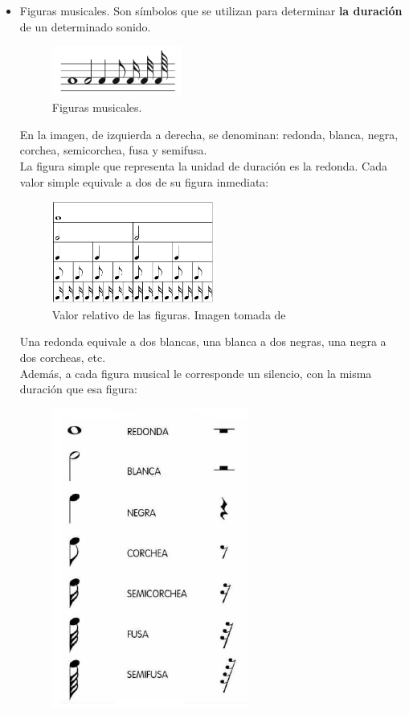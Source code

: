 \documentclass[a4paper, openright, 11pt, titlepage]{report}
\theoremstyle{definition}\newtheorem{defin}[propo]{Definition}
\theoremstyle{definition}\newtheorem{obser}[propo]{Remark}
\theoremstyle{definition}\newtheorem{ejem}[propo]{Ejemplo}
\theoremstyle{definition}\newtheorem{algoritmo}[propo]{Algoritmo}
\begin{document}
\begin{itemize}
    \item Figuras musicales. Son símbolos que se utilizan para determinar \textbf{la duración} de un determinado sonido.
    \begin{figure}[H]
            \centering
            \includegraphics[width = 0.4\textwidth]{Images/Apéndices/Apéndice A/figurasMusicales.png}
            \caption{Figuras musicales.}
    \end{figure}
    En la imagen, de izquierda a derecha, se denominan: redonda, blanca, negra, corchea, semicorchea, fusa y semifusa.\\
    La figura simple que representa la unidad de duración es la redonda. Cada valor simple equivale a dos de su figura inmediata:
    \begin{figure}[H]
            \centering
            \includegraphics[width = 0.5\textwidth]{Images/Apéndices/Apéndice A/duracionFiguras.png}
            \caption{Valor relativo de las figuras. Imagen tomada de \cite{figura}}
            \label{relativo}
    \end{figure}
    Una redonda equivale a dos blancas, una blanca a dos negras, una negra a dos corcheas, etc.\\
    Además, a cada figura musical le corresponde un silencio, con la misma duración que esa figura:
    \begin{figure}[H]
            \centering
            \includegraphics[scale = 0.8]{Images/Apéndices/Apéndice A/silencios.png}

\end{figure}
\end{itemize}
\end{document}
